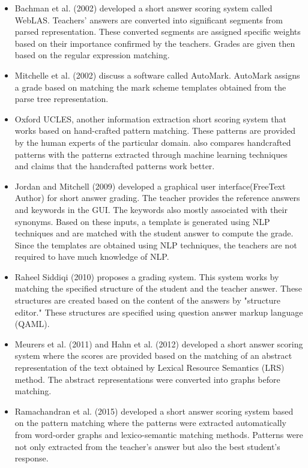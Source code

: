 \begin{itemize} 
	
	\item Bachman et al. (2002) \cite{Bachman2002} developed a short answer scoring system called WebLAS. Teachers' answers are converted into significant segments from parsed representation. These converted segments are assigned specific weights based on their importance confirmed by the teachers. Grades are given then based on the regular expression matching.
	
	\item Mitchelle et al. (2002) \cite{Mitchell2002} discuss a software called AutoMark. AutoMark assigns a grade based on matching the mark scheme templates obtained from the parse tree representation.
	
	\item Oxford UCLES,\cite{Pulman2005} another information extraction short scoring system that works based on hand-crafted pattern matching. These patterns are provided by the human experts of the particular domain. \cite{Pulman2005} also compares handcrafted patterns with the patterns extracted through machine learning techniques and claims that the handcrafted patterns work better. 
	
	\item Jordan and Mitchell (2009) \cite{Jordan2009} developed a graphical user interface(FreeText Author) for short answer grading. The teacher provides the reference answers and keywords in the GUI. The keywords also mostly associated with their synonyms. Based on these inputs, a template is generated using NLP techniques and are matched with the student answer to compute the grade. Since the templates are obtained using NLP techniques, the teachers are not required to have much knowledge of NLP.
	
	\item Raheel Siddiqi (2010)\cite{Siddiqi2010} proposes a grading system. This system works by matching the specified structure of the student and the teacher answer. These structures are created based on the content of the answers by "structure  editor." These structures are specified using question answer markup language (QAML).
	
	\item Meurers et al. (2011) \cite{Meurers2011} and Hahn et al. (2012) \cite{Hahn2012} developed a short answer scoring system where the scores are provided based on the matching of an abstract representation of the text obtained by Lexical Resource Semantics (LRS) method. The abstract representations were converted into graphs before matching. 
	
	\item Ramachandran et al. (2015) \cite{Ramachandran2015} developed a short answer scoring system based on the pattern matching where the patterns were extracted automatically from word-order graphs and lexico-semantic matching methods. Patterns were not only extracted from the teacher's answer but also the best student's response. 
	
\end{itemize}	 

